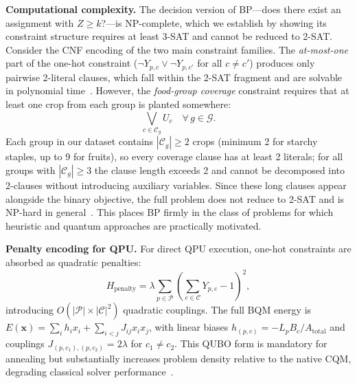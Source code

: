 \documentclass[conference]{IEEEtran}
\begin{document}
\textbf{Computational complexity.}
The decision version of BP---does there exist an assignment with $Z \geq k$?---is NP-complete, which we establish by showing its constraint structure requires at least 3-SAT and cannot be reduced to 2-SAT.
Consider the CNF encoding of the two main constraint families.
The \emph{at-most-one} part of the one-hot constraint ($\neg Y_{p,c} \vee \neg Y_{p,c'}$ for all $c \neq c'$) produces only pairwise 2-literal clauses, which fall within the 2-SAT fragment and are solvable in polynomial time~\cite{aspvall1979linear}.
However, the \emph{food-group coverage} constraint requires that at least one crop from each group is planted somewhere:
\begin{equation}
\bigvee_{c \in \mathcal{C}_g} U_c \quad \forall\, g \in \mathcal{G}.
\label{eq:coverage_clause}
\end{equation}
Each group in our dataset contains $|\mathcal{C}_g| \geq 2$ crops (minimum 2 for starchy staples, up to 9 for fruits), so every coverage clause has at least 2 literals; for all groups with $|\mathcal{C}_g| \geq 3$ the clause length exceeds 2 and cannot be decomposed into 2-clauses without introducing auxiliary variables.
Since these long clauses appear alongside the binary objective, the full problem does not reduce to 2-SAT and is NP-hard in general~\cite{garey1979computers, papadimitriou1994computational}.
This places BP firmly in the class of problems for which heuristic and quantum approaches are practically motivated.

\textbf{Penalty encoding for QPU.}
For direct QPU execution, one-hot constraints are absorbed as quadratic penalties:
\begin{equation}
H_{\text{penalty}} = \lambda \sum_{p \in \mathcal{P}} \!\left(\sum_{c \in \mathcal{C}} Y_{p,c} - 1\right)^{2},
\label{eq:penalty}
\end{equation}
introducing $O(|\mathcal{P}|{\times}|\mathcal{C}|^{2})$ quadratic couplings.
The full BQM energy is $E(\mathbf{x}){=}\sum_i h_i x_i + \sum_{i<j} J_{ij} x_i x_j$, with linear biases $h_{(p,c)}{=}{-}L_p B_c / A_{\text{total}}$ and couplings $J_{(p,c_1),(p,c_2)}{=}2\lambda$ for $c_1{\neq}c_2$.
This QUBO form is mandatory for annealing but substantially increases problem density relative to the native CQM, degrading classical solver performance~\cite{glover2018tutorial, lucas2014ising, barahona1982computational}.
\end{document}
